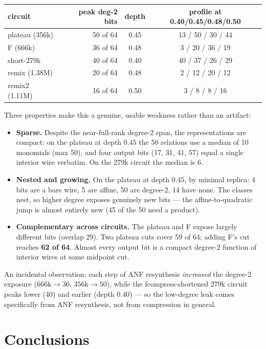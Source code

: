 \documentclass[11pt]{article}
\begin{document}
\begin{center}
\begin{tabular}{lrcc}
\toprule
circuit & peak deg-2 bits & depth & profile at 0.40/0.45/0.48/0.50 \\
\midrule
plateau (356k) & 50 of 64 & 0.45 & 13 / 50 / 30 / 44 \\
F (666k) & 36 of 64 & 0.48 & 3 / 20 / 36 / 19 \\
short-279k & 40 of 64 & 0.40 & 40 / 37 / 26 / 29 \\
remix (1.38M) & 20 of 64 & 0.48 & 2 / 12 / 20 / 12 \\
remix2 (1.11M) & 16 of 64 & 0.50 & 3 / 8 / 8 / 16 \\
\bottomrule
\end{tabular}
\end{center}

Three properties make this a genuine, usable weakness rather than an artifact:
\begin{itemize}[leftmargin=1.4em]
\item \textbf{Sparse.} Despite the near-full-rank degree-2 span, the representations are
  compact: on the plateau at depth $0.45$ the 50 relations use a median of 10 monomials
  (max 50), and four output bits (17, 31, 41, 57) equal a single interior wire verbatim.
  On the 279k circuit the median is 6.
\item \textbf{Nested and growing.} On the plateau at depth $0.45$, by minimal replica: 4
  bits are a bare wire, 5 are affine, 50 are degree-2, 14 have none. The classes nest, so
  higher degree exposes genuinely new bits --- the affine-to-quadratic jump is almost
  entirely new (45 of the 50 need a product).
\item \textbf{Complementary across circuits.} The plateau and F expose largely different
  bits (overlap 29). Two plateau cuts cover 59 of 64; adding F's cut reaches
  \textbf{62 of 64}. Almost every output bit is a compact degree-2 function of interior
  wires at some midpoint cut.
\end{itemize}

An incidental observation: each step of ANF resynthesis \emph{increased} the degree-2
exposure ($666\text{k}\to 36$, $356\text{k}\to 50$), while the fcompress-shortened 279k
circuit peaks lower (40) and earlier (depth $0.40$) --- so the low-degree leak comes
specifically from ANF resynthesis, not from compression in general.

\section{Conclusions}
\end{document}
